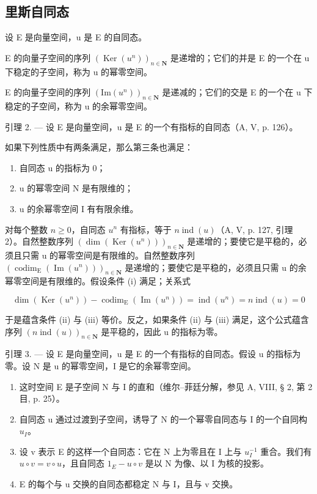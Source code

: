 \subsection{里斯自同态}

设 E 是向量空间，u 是 E 的自同态。

E 的向量子空间的序列 \((\operatorname{Ker}(u^{n}))_{n\in\mathbf{N}}\) 是递增的；它们的并是 E 的一个在 u 下稳定的子空间，称为 u 的幂零空间。

E 的向量子空间的序列 \((\mathrm{Im}(u^{n}))_{n\in\mathbf{N}}\) 是递减的；它们的交是 E 的一个在 u 下稳定的子空间，称为 u 的余幂零空间。

引理 2. --- 设 E 是向量空间，u 是 E 的一个有指标的自同态（A, V, p. 126）。

如果下列性质中有两条满足，那么第三条也满足：

\begin{enumerate}
\def\labelenumi{(\roman{enumi})}
\item
  自同态 u 的指标为 0；
\item
  u 的幂零空间 N 是有限维的；
\item
  u 的余幂零空间 I 有有限余维。
\end{enumerate}

对每个整数 \(n \geqslant 0\)，自同态 \(u^{n}\) 有指标，等于 \(n \operatorname{ind}(u)\)（A, V, p. 127, 引理 2）。自然整数序列 \((\dim(\operatorname{Ker}(u^{n})))_{n \in \mathbf{N}}\) 是递增的；要使它是平稳的，必须且只需 u 的幂零空间是有限维的。自然整数序列 \((\operatorname{codim}_{\operatorname{E}}(\operatorname{Im}(u^{n})))_{n \in \mathbf{N}}\) 是递增的；要使它是平稳的，必须且只需 u 的余幂零空间是有限维的。假设条件 (i) 满足；关系式

\[
\dim (\operatorname{Ker} (u ^ {n})) - \operatorname{codim} _ {\mathrm{E}} (\operatorname{Im} (u ^ {n})) = \operatorname{ind} (u ^ {n}) = n \operatorname{ind} (u) = 0
\]

于是蕴含条件 (ii) 与 (iii) 等价。反之，如果条件 (ii) 与 (iii) 满足，这个公式蕴含序列 \((n\operatorname{ind}(u))_{n\in\mathbf{N}}\) 是平稳的，因此 u 的指标为零。

引理 3. --- 设 E 是向量空间，u 是 E 的一个有指标的自同态。假设 u 的指标为零。设 N 是 u 的幂零空间，I 是它的余幂零空间。

\begin{enumerate}
\def\labelenumi{\alph{enumi})}
\item
  这时空间 E 是子空间 N 与 I 的直和（维尔--菲廷分解，参见 A, VIII, § 2, 第 2 目, p. 25）。
\item
  自同态 u 通过过渡到子空间，诱导了 N 的一个幂零自同态与 I 的一个自同构 \(u_{I}\)。
\item
  设 v 表示 E 的这样一个自同态：它在 N 上为零且在 I 上与 \(u_{I}^{-1}\) 重合。我们有 \(u \circ v = v \circ u\)，且自同态 \(1_{E} - u \circ v\) 是以 N 为像、以 I 为核的投影。
\item
  E 的每个与 u 交换的自同态都稳定 N 与 I，且与 v 交换。
\end{enumerate}


